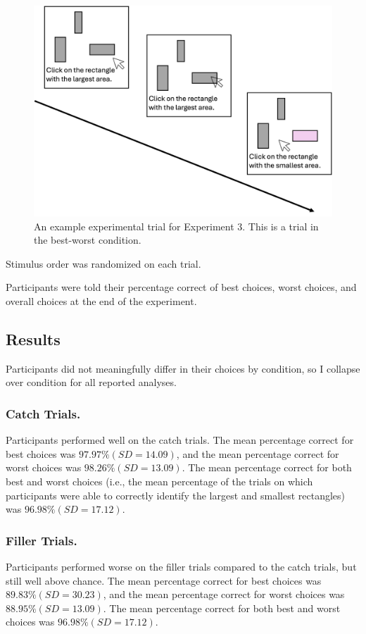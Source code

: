 \begin{figure}
   \includegraphics[width=\linewidth]{figures/bw_design_fig.jpg}
   \caption{An example experimental trial for Experiment 3. This is a trial in the best-worst condition.}
   \label{fig:bw_example_trial}
 \end{figure}
 
Stimulus order was randomized on each trial. 

Participants were told their percentage correct of best choices, worst choices, and overall choices at the end of the experiment.

\subsection{Results}

Participants did not meaningfully differ in their choices by condition, so I collapse over condition for all reported analyses.

\subsubsection{Catch Trials.}
Participants performed well on the catch trials. The mean percentage correct for best choices was $97.97\% (SD=14.09)$, and the mean percentage correct for worst choices was $98.26\% (SD=13.09)$. The mean percentage correct for both best and worst choices (i.e., the mean percentage of the trials on which participants were able to correctly identify the largest and smallest rectangles) was $96.98\% (SD=17.12)$. 

\subsubsection{Filler Trials.}
Participants performed worse on the filler trials compared to the catch trials, but still well above chance. The mean percentage correct for best choices was $89.83\% (SD=30.23)$, and the mean percentage correct for worst choices was $88.95\% (SD=13.09)$. The mean percentage correct for both best and worst choices was $96.98\% (SD=17.12)$. 


